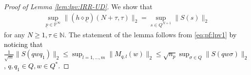 \documentclass[10pt,a4paper]{amsart}
\begin{document}
  \begin{proof}[Proof of Lemma \ref{lem:lpv:IRR-UD}]
   We show that 
      \begin{equation}
      \label{eq:pf:lpv1}
      \begin{split}
          \sup_{\underline{p} \in \mathbb{P}^{\infty}}\!\! %
          \|(h \diamond \underline{p})(N+\tau,\tau)\|_2
          \!\! = \!\! 
          \sup_{s \in Q^{N+1}}  \|S(s)\|_2 
      \end{split}
      \end{equation}
   for any \textcolor{black}{$N \ge 1,\tau \in \mathbb{N}$}.  %
      The statement of the lemma follows from \eqref{eq:pf:lpv1}
      \textcolor{black}{by noticing that 
       $\frac{1}{\sqrt{m}} \|S(qwq_1)\|_2  \le \sup_{l=1,\ldots,m} \|M_{q,l}(w)\|_2 \le \sqrt{n_p} \sup_{\sigma  \in Q} \|S(q w\sigma)\|_2$, $q,q_1 \in Q,w \in Q^{*}$.}

\end{proof}
\end{document}

